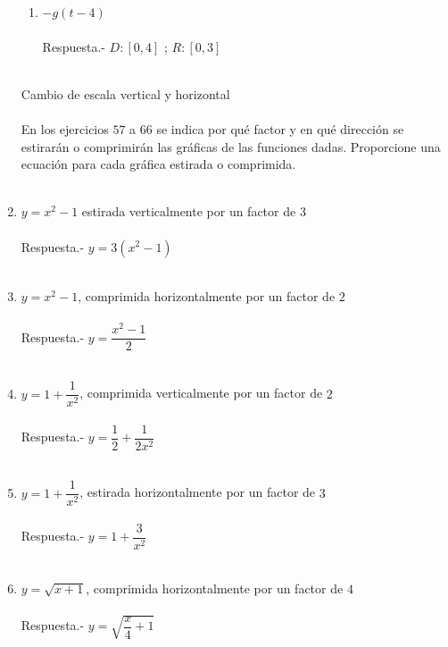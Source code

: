 \begin{enumerate}
\begin{enumerate}[\bfseries a)]
	\item $-g(t-4)$\\\\
	    Respuesta.-\; $D:[0,4]$ ; $R:[0,3]$\\\\

    \end{enumerate}

Cambio de escala vertical y horizontal\\\\
En los ejercicios $57$ a $66$ se indica por qué factor y en qué dirección se estirarán o comprimirán las gráficas de las funciones dadas. Proporcione una ecuación para cada gráfica estirada o comprimida.\\\\

\item $y=x^2-1$ estirada verticalmente por un factor de $3$\\\\
    Respuesta.-\; $y=3(x^2-1)$\\\\

\item $y=x^2-1$, comprimida horizontalmente por un factor de $2$ \\\\
    Respuesta.-\; $y=\dfrac{x^2-1}{2}$ \\\\

\item $y=1 + \dfrac{1}{x^2}$, comprimida verticalmente por un factor de $2$ \\\\
    Respuesta.-\; $y=\dfrac{1}{2}+\dfrac{1}{2x^2}$ \\\\

\item $y=1+\dfrac{1}{x^2}$, estirada horizontalmente por un factor de $3$ \\\\
    Respuesta.-\; $y=1+\dfrac{3}{x^2}$ \\\\

\item $y=\sqrt{x+1}$, comprimida horizontalmente por un factor de $4$ \\\\
    Respuesta.-\; $y=\sqrt{\dfrac{x}{4} + 1}$ \\\\


\end{enumerate}
